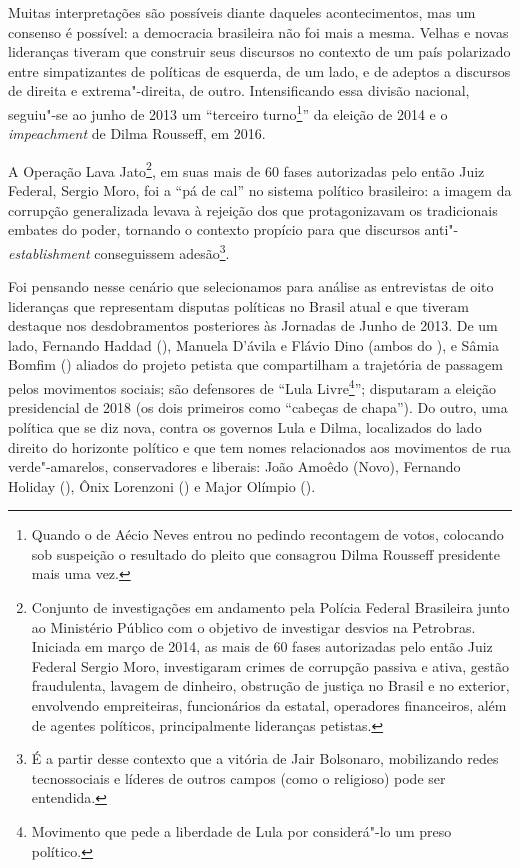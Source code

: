 Muitas interpretações são possíveis diante daqueles acontecimentos, mas
um consenso é possível: a democracia brasileira não foi mais a mesma.
Velhas e novas lideranças tiveram que construir seus discursos no
contexto de um país polarizado entre simpatizantes de políticas de
esquerda, de um lado, e de adeptos a discursos de direita e
extrema"-direita, de outro. Intensificando essa divisão nacional,
seguiu"-se ao junho de 2013 um ``terceiro turno\footnote{Quando o  de
  Aécio Neves entrou no  pedindo recontagem de votos, colocando sob
  suspeição o resultado do pleito que consagrou Dilma Rousseff
  presidente mais uma vez.}'' da eleição de 2014 e o \emph{impeachment}
de Dilma Rousseff, em 2016.

A Operação Lava Jato\footnote{Conjunto de investigações em andamento
  pela Polícia Federal Brasileira junto ao Ministério Público com o
  objetivo de investigar desvios na Petrobras. Iniciada em março de
  2014, as mais de 60 fases autorizadas pelo então Juiz Federal Sergio
  Moro, investigaram crimes de corrupção passiva e ativa, gestão
  fraudulenta, lavagem de dinheiro, obstrução de justiça no Brasil e no
  exterior, envolvendo empreiteiras, funcionários da estatal, operadores
  financeiros, além de agentes políticos, principalmente lideranças
  petistas.}, em suas mais de 60 fases autorizadas pelo então Juiz
Federal, Sergio Moro, foi a ``pá de cal'' no sistema político
brasileiro: a imagem da corrupção generalizada levava à rejeição dos que
protagonizavam os tradicionais embates do poder, tornando o contexto
propício para que discursos anti"-\emph{establishment} conseguissem
adesão\footnote{É a partir desse contexto que a vitória de Jair
  Bolsonaro, mobilizando redes tecnossociais e líderes de outros campos
  (como o religioso) pode ser entendida.}.

Foi pensando nesse cenário que selecionamos para análise as entrevistas
de oito lideranças que representam disputas políticas no Brasil atual e
que tiveram destaque nos desdobramentos posteriores às Jornadas de Junho
de 2013. De um lado, Fernando Haddad (), Manuela D'ávila e Flávio Dino
(ambos do ), e Sâmia Bomfim () aliados do projeto petista que
compartilham a trajetória de passagem pelos movimentos sociais; são
defensores de ``Lula Livre\footnote{Movimento que pede a liberdade de
  Lula por considerá"-lo um preso político.}''; disputaram a eleição
presidencial de 2018 (os dois primeiros como ``cabeças de chapa''). Do
outro, uma política que se diz nova, contra os governos Lula e Dilma,
localizados do lado direito do horizonte político e que tem nomes
relacionados aos movimentos de rua verde"-amarelos, conservadores e
liberais: João Amoêdo (Novo), Fernando Holiday (), Ônix Lorenzoni
() e Major Olímpio ().

